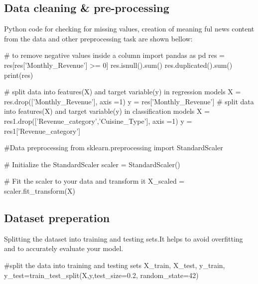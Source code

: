\documentclass{josis}
\begin{document}
\subsection{Data cleaning \& pre-processing}
Python code for checking for missing values, creation of meaning ful news content from the data and other preprocessing task are shown bellow:
\begin{python}
# to remove negative values inside a column
import pandas as pd
res = res[res['Monthly_Revenue'] >= 0]
res.isnull().sum()
res.duplicated().sum()
print(res)
\end{python}   
\begin{python}
# split data into features(X) and target variable(y) in regression models
X = res.drop(['Monthly_Revenue'], axis =1)
y = res['Monthly_Revenue']
# split data into features(X) and target variable(y) in classification  models
X = res1.drop(['Revenue_category','Cuisine_Type'], axis =1)
y = res1['Revenue_category']

#Data preprocessing
from sklearn.preprocessing import StandardScaler

# Initialize the StandardScaler
scaler = StandardScaler()

# Fit the scaler to your data and transform it
X_scaled = scaler.fit_transform(X)

\end{python}
\subsection{Dataset preperation}
Splitting the dataset into training and testing sets.It helps to avoid overfitting and to accurately evaluate your model.  
\begin{python}
#split the data into training and testing sets
X_train, X_test, y_train, y_test=train_test_split(X,y,test_size=0.2,
random_state=42)
\end{python}
\end{document}
